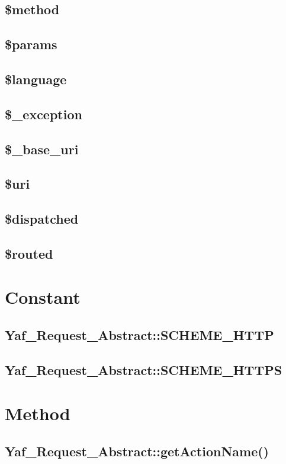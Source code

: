 \subsection{\$method}
\subsection{\$params}
\subsection{\$language}
\subsection{\$\_exception}
\subsection{\$\_base\_uri}
\subsection{\$uri}
\subsection{\$dispatched}
\subsection{\$routed}



\section{Constant}


\subsection{Yaf\_Request\_Abstract::SCHEME\_HTTP}

\subsection{Yaf\_Request\_Abstract::SCHEME\_HTTPS}

\section{Method}


\subsection{Yaf\_Request\_Abstract::getActionName()}








